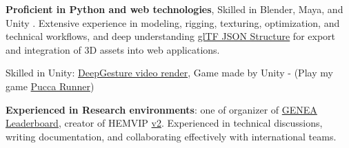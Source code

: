 \begin{onecolentry}
\begin{highlightsforbulletentries}
			
			
			\item \textbf{Proficient in Python and web technologies}, Skilled in Blender, Maya, and Unity . Extensive experience in modeling, rigging, texturing, optimization, and technical workflows, and deep understanding \href{https://github.com/hmthanh/glTF-Sample-Viewer}{glTF JSON Structure} for export and integration of 3D assets into web applications.  
			
			Skilled in Unity: \href{https://www.youtube.com/watch?v=B6nv1kQmi-Q}{DeepGesture video render}, Game made by Unity - (Play my game \href{https://puccarunner.github.io}{Pucca Runner})
			

			
			\item \textbf{Experienced in Research environments}: one of organizer of
			 \href{https://bit.ly/GENEALeaderboard}{GENEA Leaderboard}, creator of HEMVIP \href{https://github.com/hemvip/hemvip.github.io}{v2}.  Experienced in technical discussions, writing documentation, and collaborating effectively with international teams.
			
		
			

		\end{highlightsforbulletentries}
	\end{onecolentry}
	
	
	
	
	